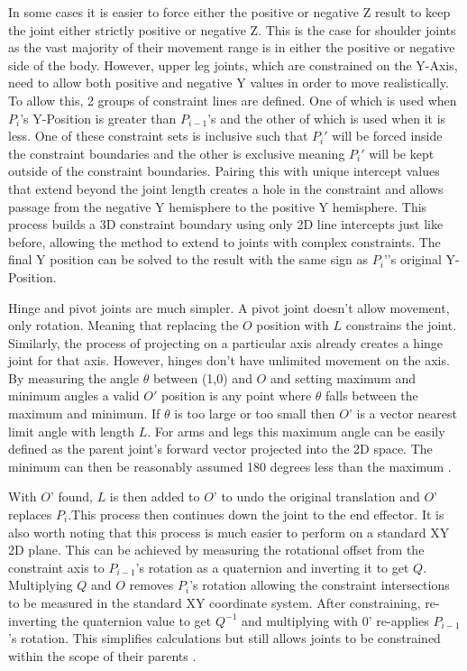\documentclass[10pt,twocolumn]{article}
\begin{document}
In some cases it is easier to force either the positive or negative Z result to keep the joint either strictly positive or negative Z. This is the case for shoulder joints as the vast majority of their movement range is in either the positive or negative side of the body. However, upper leg joints, which are constrained on the Y-Axis, need to allow both positive and negative Y values in order to move realistically. To allow this, 2 groups of constraint lines are defined. One of which is used when $P_i$’s  Y-Position is greater than $P_{i-1}$’s and the other of which is used when it is less. One of these constraint sets is inclusive such that $P_i'$ will be forced inside the constraint boundaries and the other is exclusive meaning $P_i'$ will be kept outside of the constraint boundaries. Pairing this with unique intercept values that extend beyond the joint length creates a hole in the constraint and allows passage from the negative Y hemisphere to the positive Y hemisphere. This process builds a 3D constraint boundary using only 2D line intercepts just like before, allowing the method to extend to joints with complex constraints. The final Y position can be solved to the result with the same sign as $P_i’$’s original Y-Position.

Hinge and pivot joints are much simpler. A pivot joint doesn’t allow movement, only rotation. Meaning that replacing the $O$ position with $L$ constrains the joint. Similarly, the process of projecting on a particular axis already creates a hinge joint for that axis. However, hinges don’t have unlimited movement on the axis. By measuring the angle $\theta$ between (1,0) and $O$ and setting maximum and minimum angles a valid $O'$ position is any point where $\theta$ falls between the maximum and minimum. If $\theta$ is too large or too small then $O’$ is a vector nearest limit angle with length $L$. For arms and legs this maximum angle can be easily defined as the parent joint’s forward vector projected into the 2D space. The minimum can then be reasonably assumed 180 degrees less than the maximum \cite{baseFABRIK}\cite{CGjointStructure}.

With $O’$ found, $L$ is then added to $O’$ to undo the original translation and $O’$ replaces $P_i$.This process then continues down the joint to the end effector. It is also worth noting that this process is much easier to perform on a standard XY 2D plane. This can be achieved by measuring the rotational offset from the constraint axis to $P_{i-1}$'s rotation as a quaternion and inverting it to get $Q$. Multiplying $Q$ and $O$ removes $P_i$'s rotation allowing the constraint intersections to be measured in the standard XY coordinate system. After constraining, re-inverting the quaternion value to get $Q^{-1}$ and multiplying with $0’$ re-applies $P_{i-1}$'s rotation. This simplifies calculations but still allows joints to be constrained within the scope of their parents \cite{swingTwist}\cite{Quaternions}.
\end{document}
